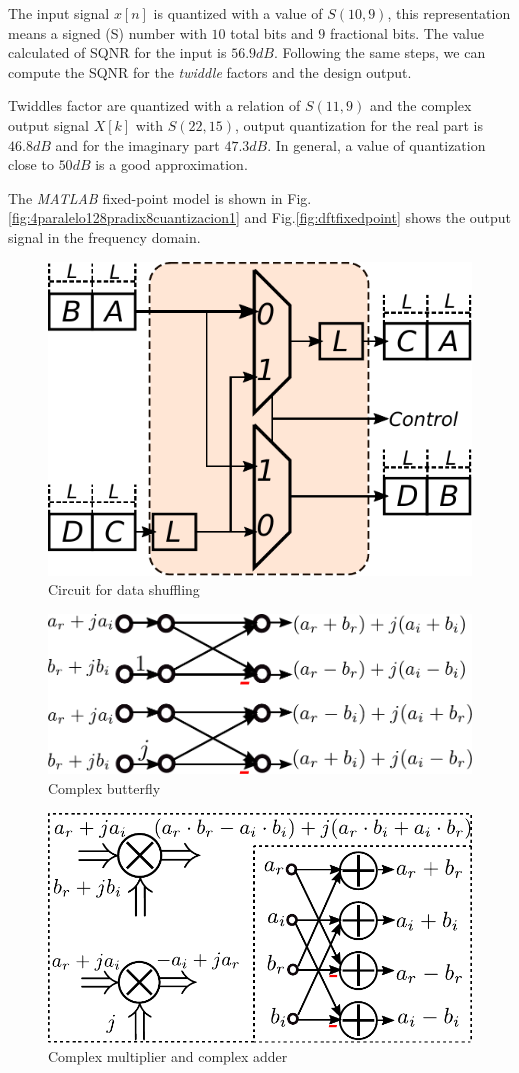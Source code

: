 \documentclass[journal,comsoc]{IEEEtran}
\begin{document}
The input signal $x[n]$ is quantized with a value of $S(10,9)$, this representation means a signed (S) number with $10$ total bits and $9$ fractional bits. The value calculated of SQNR for the input is $56.9dB$. Following the same steps, we can compute the SQNR for the \textit{twiddle} factors and the design output.

Twiddles factor are quantized with a relation of $S(11,9)$ and the complex output signal $X[k]$ with $S(22,15)$, output quantization for the real part is $46.8dB$ and for the imaginary part $47.3dB$. In general, a value of quantization close to $50dB$ is a good approximation.


The \textit{MATLAB} fixed-point model is shown in Fig. \ref{fig:4paralelo128pradix8cuantizacion1} and  Fig.\ref{fig:dftfixedpoint} shows the output signal in the frequency domain.

\begin{figure}[ht!] 
	\centering
	\includegraphics[width=0.3\linewidth]{Diagramas/miSeccionFiguras/Shift.pdf}
	\caption{Circuit for data shuffling}
	\label{fig:shift}
\end{figure}
\begin{figure}[ht!] 
	\centering
	\includegraphics[width=0.6\linewidth]{Diagramas/miSeccionFiguras/ButterComplejo.pdf}
	\caption{Complex butterfly }
	\label{fig:buttercomplejo}
\end{figure}
\begin{figure}[ht!] 
	\centering
	\includegraphics[width=0.65\linewidth]{Diagramas/miSeccionFiguras/SumMult.pdf}
	\caption{Complex multiplier and complex adder}
	\label{fig:summult}
\end{figure}
\end{document}
